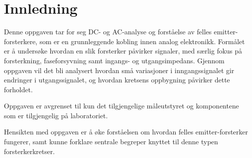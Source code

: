 \section{Innledning}
    Denne oppgaven tar for seg DC- og AC-analyse og forståelse av felles emitter-forsterkere, som er en grunnleggende kobling innen analog elektronikk. Formålet er å undersøke hvordan en slik forsterker påvirker signaler, med særlig fokus på forsterkning, faseforsyvning samt ingangs- og utgangsimpedans.
    Gjennom oppgaven vil det bli analysert hvordan små variasjoner i inngangssignalet gir endringer i utgangssignalet, og hvordan kretsens oppbygning påvirker dette forholdet.

    Oppgaven er avgrenset til kun det tilgjengelige måleutstyret og komponentene som er tilgjengelig på laboratoriet.

    Hensikten med oppgaven er å øke forståelsen om hvordan felles emitter-forsterker fungerer, samt kunne forklare sentrale begreper knyttet til denne typen forsterkerkretser. 
